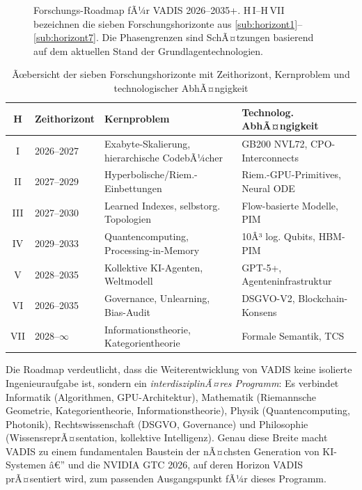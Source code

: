 ﻿\documentclass[12pt,a4paper]{article}
\begin{document}
\begin{figure}[ht]
\caption{Forschungs-Roadmap fÃ¼r VADIS 2026--2035+.
         H\,I--H\,VII bezeichnen die sieben Forschungshorizonte
         aus \cref{sub:horizont1}--\cref{sub:horizont7}.
         Die Phasengrenzen sind SchÃ¤tzungen basierend auf
         dem aktuellen Stand der Grundlagentechnologien.}
\label{fig:roadmap}
\end{figure}

\begin{table}[ht]
\centering
\small
\caption{Ãœbersicht der sieben Forschungshorizonte mit
         Zeithorizont, Kernproblem und technologischer
         AbhÃ¤ngigkeit}
\label{tab:horizonte}
\begin{tabular}{@{}clp{3.5cm}p{3.5cm}@{}}
\toprule
\textbf{H} & \textbf{Zeithorizont} & \textbf{Kernproblem} &
\textbf{Technolog. AbhÃ¤ngigkeit} \\
\midrule
I   & 2026--2027 & Exabyte-Skalierung, hierarchische CodebÃ¼cher &
                   GB200 NVL72, CPO-Interconnects \\
II  & 2027--2029 & Hyperbolische/Riem.-Einbettungen &
                   Riem.-GPU-Primitives, Neural ODE \\
III & 2027--2030 & Learned Indexes, selbstorg. Topologien &
                   Flow-basierte Modelle, PIM \\
IV  & 2029--2033 & Quantencomputing, Processing-in-Memory &
                   10Â³ log. Qubits, HBM-PIM \\
V   & 2028--2035 & Kollektive KI-Agenten, Weltmodell &
                   GPT-5+, Agenteninfrastruktur \\
VI  & 2026--2035 & Governance, Unlearning, Bias-Audit &
                   DSGVO-V2, Blockchain-Konsens \\
VII & 2028--$\infty$ & Informationstheorie, Kategorientheorie &
                   Formale Semantik, TCS \\
\bottomrule
\end{tabular}
\end{table}

Die Roadmap verdeutlicht, dass die Weiterentwicklung von
VADIS keine isolierte Ingenieuraufgabe ist, sondern ein
\emph{interdisziplinÃ¤res Programm}: Es verbindet
Informatik (Algorithmen, GPU-Architektur),
Mathematik (Riemannsche Geometrie, Kategorientheorie,
Informationstheorie), Physik (Quantencomputing, Photonik),
Rechtswissenschaft (DSGVO, Governance) und
Philosophie (WissensreprÃ¤sentation, kollektive Intelligenz).
Genau diese Breite macht VADIS zu einem
fundamentalen Baustein der nÃ¤chsten Generation von KI-Systemen â€”
und die NVIDIA GTC 2026, auf deren Horizon VADIS prÃ¤sentiert wird,
zum passenden Ausgangspunkt fÃ¼r dieses Programm.
\end{document}
